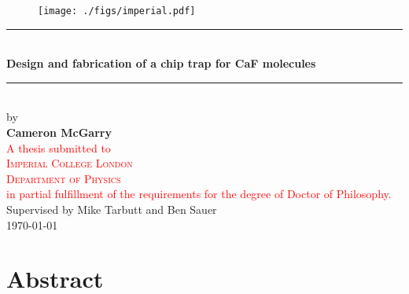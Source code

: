 \documentclass[a4paper, 12pt, twoside]{report}
\newcommand{\thesis}[1]{\textcolor{red}{#1}} %
\newcommand{\CaF}{CaF}
\begin{document}

\begin{titlepage}

  \begin{figure}
    \texttt{[image: ./figs/imperial.pdf]}
  \end{figure}

  \begin{center}
    \vspace*{1cm}
    \rule{\linewidth}{0.5mm} \\[0.4cm]
    {\huge \bfseries Design and fabrication of a chip trap for \CaF{} molecules}\\
    \rule{\linewidth}{0.5mm} \\[1.0cm]
    by \\[0.5cm]
    {\Large \textbf{Cameron McGarry}} \\[0.5cm]
    \thesis{
    A thesis submitted to \\[0.5cm]
    \textsc{\Large Imperial College London}\\[0.5cm] 
    \textsc{\large Department of Physics}\\[0.5cm] 
    in partial fulfillment of the requirements for the degree of Doctor of
    Philosophy. \\[0.5cm]
  }
    Supervised by Mike Tarbutt and Ben Sauer \\[0.5cm]
    \makeatletter
    \monthyeardate\today
    \makeatother

  \end{center}



\end{titlepage}

\chapter*{Abstract}

\clearpage

\tableofcontents
\clearpage

\setcounter{page}{4} 

\end{document}
